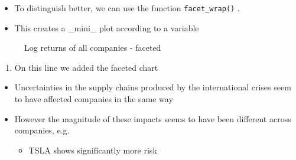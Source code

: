 \documentclass[
  12pt]{article}
\providecommand{\tightlist}{%
  \setlength{\itemsep}{0pt}\setlength{\parskip}{0pt}}\usepackage{longtable,booktabs,array}
\theoremstyle{definition}
\theoremstyle{remark}
\begin{document}
\begin{itemize}
\item
  To distinguish better, we can use the function \texttt{facet\_wrap()}
  .
\item
  This creates a \_mini\_ plot according to a variable
\end{itemize}

\begin{figure}


\caption{\label{fig-log-returns-all-stocks-faceted}Log returns of all
companies - faceted}

\end{figure}%

\begin{enumerate}
\def\labelenumi{\arabic{enumi}.}
\tightlist
\item
  On this line we added the faceted chart
\end{enumerate}

\begin{tcolorbox}[enhanced jigsaw, titlerule=0mm, toptitle=1mm, bottomrule=.15mm, left=2mm, arc=.35mm, colframe=quarto-callout-important-color-frame, rightrule=.15mm, opacityback=0, coltitle=black, colbacktitle=quarto-callout-important-color!10!white, title=\textcolor{quarto-callout-important-color}{\faExclamation}\hspace{0.5em}{What can we see?}, bottomtitle=1mm, breakable, leftrule=.75mm, colback=white, opacitybacktitle=0.6, toprule=.15mm]

\begin{itemize}
\item
  Uncertainties in the supply chains produced by the international
  crises seem to have affected companies in the same way
\item
  However the magnitude of these impacts seems to have been different
  across companies, e.g.

  \begin{itemize}
  \tightlist
  \item
    TSLA shows significantly more risk
  \end{itemize}
\end{itemize}

\end{tcolorbox}
\end{document}
